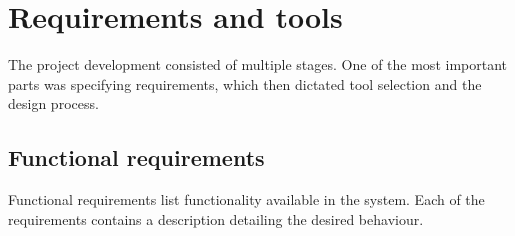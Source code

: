 \chapter{Requirements and tools}
\label{chap:req-and-tools}

The project development consisted of multiple stages. One of the most important parts was specifying requirements, which then dictated tool selection and the design process.

\section{Functional requirements}

Functional requirements list functionality available in the system. Each of the requirements contains a description detailing the desired behaviour.

